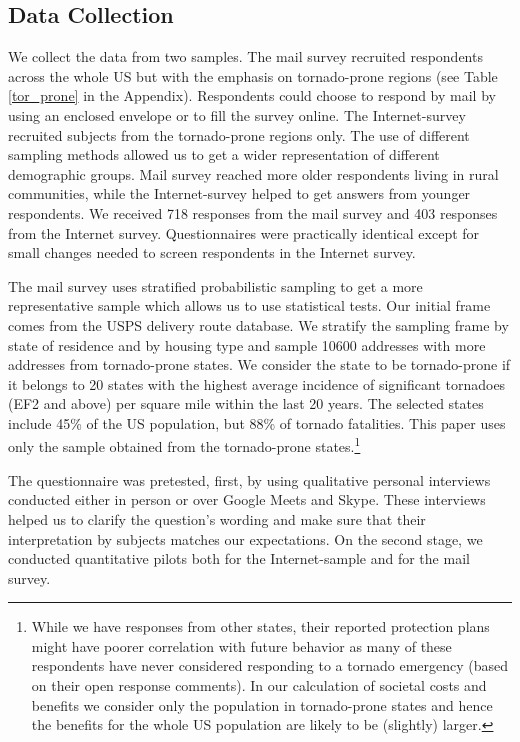 \documentclass{ametsocV6.1}
\begin{document}
\subsection{Data Collection} 
We collect the data from two samples. The mail survey recruited respondents across the whole US but with the emphasis on tornado-prone regions (see Table \ref{tor_prone} in the Appendix). Respondents could choose to respond by mail by using an enclosed envelope or to fill the survey online. The Internet-survey recruited subjects from the tornado-prone regions only. The use of different sampling methods allowed us to get a wider representation of different demographic groups. Mail survey reached more older respondents living in rural communities, while the Internet-survey helped to get answers from younger respondents. We received 718 responses from the mail survey and 403 responses from the Internet survey. Questionnaires were practically identical  except for small changes needed to screen respondents in the Internet survey. 

The mail survey uses stratified probabilistic sampling to get a more representative sample which allows us to use statistical tests. Our initial frame comes from the USPS delivery route database. We stratify the sampling frame by state of residence and by housing type and sample 10600 addresses with more addresses from tornado-prone states. We consider the state to be tornado-prone if it belongs to 20 states with the highest average incidence of significant tornadoes (EF2 and above) per square mile within the last 20 years.  The selected states include 45\% of the US population, but 88\% of tornado fatalities. This paper uses only the sample obtained from the tornado-prone states.\footnote{While we have responses from other states, their reported protection plans might have poorer correlation with future behavior as many of these respondents have never considered responding to a tornado emergency (based on their open response comments). In our calculation of societal costs and benefits we consider only the population in tornado-prone states and hence the benefits for the whole US population are likely to be (slightly) larger.}

The questionnaire was pretested, first, by using qualitative personal  interviews conducted either in person or over Google Meets and Skype. These interviews helped us to clarify the question's wording and make sure that their interpretation by subjects matches our expectations. On the second stage, we conducted quantitative pilots both for the Internet-sample and for the mail survey.
\end{document}
